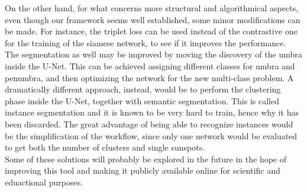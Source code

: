 On the other hand, for what concerns more structural and algorithmical aspects, even though our framework seems well established, some minor modifications can be made. For instance, the triplet loss can be used instead of the contrastive one for the training of the siamese network, to see if it improves the performance. The segmentation as well may be improved by moving the discovery of the umbra inside the U-Net. This can be achieved assigning different classes for umbra and penumbra, and then optimizing the network for the new multi-class problem. A dramatically different approach, instead, would be to perform the clustering phase inside the U-Net, together with semantic segmentation. This is called instance segmentation and it is known to be very hard to train, hence why it has been discarded. The great advantage of being able to recognize instances would be the simplification of the workflow, since only one network would be evaluated to get both the number of clusters and single sunspots. \\
Some of these solutions will probably be explored in the future in the hope of improving this tool and making it publicly available online for scientific and eduactional purposes.
